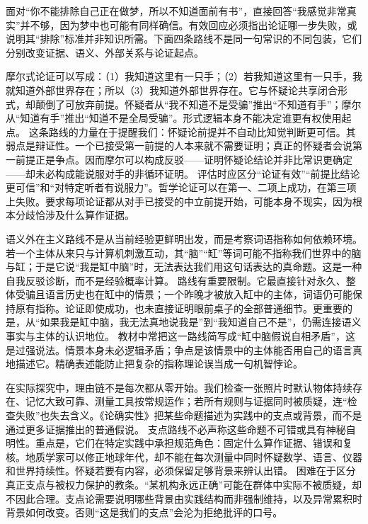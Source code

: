  面对“你不能排除自己正在做梦，所以不知道面前有书”，直接回答“我感觉非常真实”并不够，因为梦中也可能有同样确信。有效回应必须指出论证哪一步失败，或说明其“排除”标准并非知识所需。下面四条路线不是同一句常识的不同包装，它们分别改变证据、语义、外部关系与论证起点。

摩尔式论证可以写成：（1）我知道这里有一只手；（2）若我知道这里有一只手，我就知道外部世界存在；所以（3）我知道外部世界存在。它与怀疑论共享闭合形式，却颠倒了可放弃前提。怀疑者从“我不知道不是受骗”推出“不知道有手”；摩尔从“知道有手”推出“知道不是全局受骗”。形式逻辑本身不能决定谁更有权使用起点。 这条路线的力量在于提醒我们：怀疑论前提并不自动比知觉判断更可信。其弱点是辩证性。一个已接受第一前提的人本来就不需要证明；真正的怀疑者会说第一前提正是争点。因而摩尔可以构成反驳——证明怀疑论结论并非比常识更确定——却未必构成能说服对手的非循环证明。 评估时应区分“论证有效”“前提比结论更可信”和“对特定听者有说服力”。哲学论证可以在第一、二项上成功，在第三项上失败。要求每项论证都从对手已接受的中立前提开始，可能本身不现实，因为根本分歧恰涉及什么算作证据。

语义外在主义路线不是从当前经验更鲜明出发，而是考察词语指称如何依赖环境。若一个主体从来只与计算机刺激互动，其“脑”“缸”等词可能不指称我们世界中的脑与缸；于是它说“我是缸中脑”时，无法表达我们用这句话表达的真命题\parencite{putnam1981}。这是一种自我反驳诊断，而不是经验概率计算。 路线有重要限制。它最直接针对永久、整体受骗且语言历史也在缸中的情景；一个昨晚才被放入缸中的主体，词语仍可能保持原有指称。论证即使成功，也未直接证明眼前桌子的全部普通细节。更重要的是，从“如果我是缸中脑，我无法真地说我是”到“我知道自己不是”，仍需连接语义事实与主体的认识地位。 教材中常把这一路线简写成“缸中脑假说自相矛盾”，这是过强说法。情景本身未必逻辑矛盾；争点是该情景中的主体能否用自己的语言真地描述它。精确表述能防止把复杂的指称理论误当成一句机智悖论。

在实际探究中，理由链不是每次都从零开始。我们检查一张照片时默认物体持续存在、记忆大致可靠、测量工具按常规运作；若所有规则与证据同时被质疑，连“检查失败”也失去含义。《论确实性》把某些命题描述为实践中的支点或背景，而不是通过更多证据推出的普通假说\parencite{wittgenstein1969}。 支点路线不必声称这些命题不可错或具有神秘自明性。重点是，它们在特定实践中承担规范角色：固定什么算作证据、错误和复核。地质学家可以修正地球年代，却不能在每次测量中同时怀疑数学、语言、仪器和世界持续性。怀疑若要有内容，必须保留足够背景来辨认出错。 困难在于区分真正支点与被权力保护的教条。“某机构永远正确”可能在群体中实际不被质疑，却不因此合理。支点论需要说明哪些背景由实践结构而非强制维持，以及异常累积时背景如何改变。否则“这是我们的支点”会沦为拒绝批评的口号。

